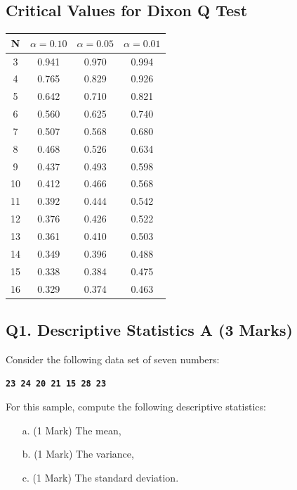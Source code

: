\documentclass[a4paper,12pt]{article}
\begin{document}
\subsection*{Critical Values for Dixon Q Test}
{
	\Large
	\begin{center}
		\begin{tabular}{|c|c|c|c|}
			\hline  N  & $\alpha=0.10$  & $\alpha=0.05$  & $\alpha=0.01$  \\ \hline
			3  & 0.941 & 0.970 & 0.994 \\ \hline
			4  & 0.765 & 0.829 & 0.926 \\ \hline
			5  & 0.642 & 0.710  & 0.821 \\ \hline
			6  & 0.560 & 0.625 & 0.740 \\ \hline
			7  & 0.507 & 0.568 & 0.680  \\ \hline
			8  & 0.468 & 0.526 & 0.634 \\ \hline
			9  & 0.437 & 0.493 & 0.598 \\ \hline
			10 & 0.412 & 0.466 & 0.568 \\ \hline
			11 & 0.392 & 0.444 & 0.542 \\ \hline
			12 & 0.376 & 0.426 & 0.522 \\ \hline
			13 & 0.361 & 0.410 & 0.503 \\ \hline
			14 & 0.349 & 0.396 & 0.488 \\ \hline
			15 & 0.338 & 0.384 & 0.475 \\ \hline
			16 & 0.329 & 0.374 & 0.463 \\ \hline
		\end{tabular} 
	\end{center}
}


\subsection*{Q1. Descriptive Statistics A (3 Marks)} %
Consider the following data set of seven numbers:

\begin{center}
	\textbf{\texttt{23 24 20 21 15 28 23}}
\end{center}

\noindent For this sample, compute the following descriptive statistics:
\begin{itemize}
	\item[a.] (1 Mark) The mean,
	\item[b.] (1 Mark) The variance,
	\item[c.] (1 Mark) The standard deviation.
\end{itemize}
\end{document}
